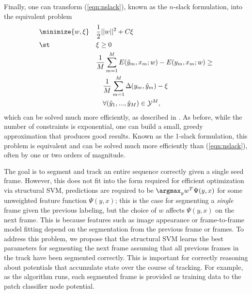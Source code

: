 \documentclass[conference]{IEEEtran}
\begin{document}
Finally, one can transform (\ref{eqn:nslack}), known as the $n$-slack formulation, into the equivalent problem
\begin{equation}
  \begin{aligned}
    & \minimize{w, \xi} & & \frac{1}{2} ||w||^2 + C\xi \\
    & \st & & \xi \geq 0 \\
    & & & \frac{1}{M} \sum_{m=1}^M E ( \hat{y}_m, x_m; w )
    - E ( y_m, x_m; w ) \geq \\
    & & & \quad \frac{1}{M} \sum_{m=1}^M \Delta(y_m, \hat{y}_m) - \xi \\
    & & & \quad \forall (\hat{y}_1, ..., \hat{y}_M) \in \mathcal{Y}^M,
  \end{aligned}
\end{equation}
which can be solved much more efficiently, as described in \citet{joachims2009a}.  As before, while the number of constraints is exponential, one can build a small, greedy approximation that produces good results.  Known as the 1-slack formulation, this problem is equivalent and can be solved much more efficiently than (\ref{eqn:nslack}), often by one or two orders of magnitude.

The goal is to segment and track an entire sequence correctly given a single seed frame.  However, this does not fit into the form required for efficient optimization via structural SVM, \ie predictions are required to be $\argmax_y w^T \Psi(y, x)$ for some unweighted feature function $\Psi(y, x)$; this is the case for segmenting a \emph{single} frame given the previous labeling, but the choice of $w$ affects $\Psi(y, x)$ on the next frame.  This is because features such as image appearance or frame-to-frame model fitting depend on the segmentation from the previous frame or frames.  To address this problem, we propose that the structural SVM learns the best parameters for segmenting the next frame assuming that all previous frames in the track have been segmented correctly.  This is important for correctly reasoning about potentials that accumulate state over the course of tracking.  For example, as the algorithm runs, each segmented frame is provided as training data to the patch classifier node potential.
\end{document}
